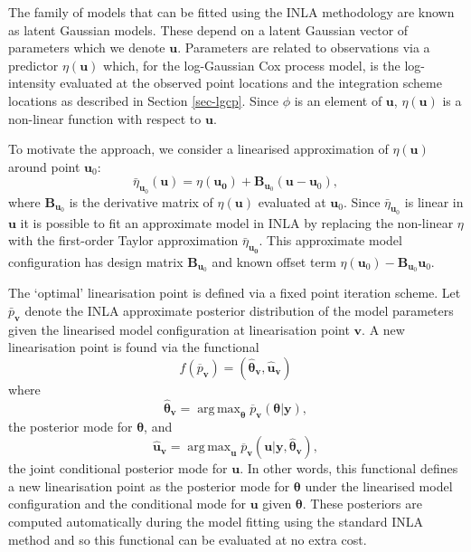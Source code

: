 \documentclass{statsoc}
\newcommand{\ol}[1]{\overline{#1}}
\newcommand{\wh}[1]{\widehat{#1}}
\newcommand{\bm}{\boldsymbol}  %
\DeclareMathOperator*{\argmax}{arg\,max}  %
\begin{document}
The family of models that can be fitted using the INLA methodology are known as latent Gaussian models.  These depend on a latent Gaussian vector of parameters which we denote $\bm{u}$. Parameters are related to observations via a predictor $\eta(\bm{u})$ which, for the log-Gaussian Cox process model, is the log-intensity evaluated at the observed point locations and the integration scheme locations as described in Section \ref{sec-lgcp}.  Since $\phi$ is an element of $\bm{u}$, $\eta(\bm{u})$ is a non-linear function with respect to $\bm{u}$.

To motivate the approach, we consider a linearised approximation of $\eta(\bm{u})$ around point $\bm{u}_0$:
\begin{equation*}
\bar{\eta}_{\bm{u}_0} (\bm{u}) = \eta(\bm{u_0}) + \bm{B}_{\bm{u}_0}(\bm{u} - \bm{u}_0),
\end{equation*}
where $\bm{B}_{\bm{u}_0}$ is the derivative matrix of $\eta(\bm{u})$ evaluated at $\bm{u}_0$.  Since $\bar{\eta}_{\bm{u}_0}$ is linear in $\bm{u}$ it is possible to fit an approximate model in INLA by replacing the non-linear $\eta$ with the first-order Taylor approximation $\bar{\eta}_{\bm{u_0}}$.  This approximate model configuration has design matrix $\bm{B}_{\bm{u}_0}$ and known offset term $\eta(\bm{u}_0) - \bm{B}_{\bm{u}_0}\bm{u}_0$.

The `optimal' linearisation point is defined via a fixed point iteration scheme. Let $\bar{p}_{\bm{v}}$ denote the INLA approximate posterior distribution of the model parameters given the linearised model configuration at linearisation point $\bm{v}$.  A new linearisation point is found via the functional
\begin{equation}
	f(\ol{p}_{\bm{v}}) = (\wh{\bm{\theta}}_{\bm{v}},\wh{\bm{u}}_{\bm{v}})
\end{equation}
where
\begin{equation}
\wh{\bm{\theta}}_{\bm{v}} = \argmax_{\bm{\theta}} \ol{p}_{\bm{v}} ( \bm{\theta} | \bm{y}),
\end{equation}
the posterior mode for $\bm{\theta}$, and
\begin{equation}
\wh{\bm{u}}_{\bm{v}} = \argmax_{\bm{u}} \ol{p}_{\bm{v}} (\bm{u} | \bm{y}, \wh{\bm{\theta}}_{\bm{v}}),
\end{equation}
the joint conditional posterior mode for $\bm{u}$.  In other words, this functional defines a new linearisation point as the posterior mode for $\bm{\theta}$ under the linearised model configuration and the conditional mode for $\bm{u}$ given $\bm{\theta}$.  These posteriors are computed automatically during the model fitting using the standard INLA method and so this functional can be evaluated at no extra cost.
\end{document}
